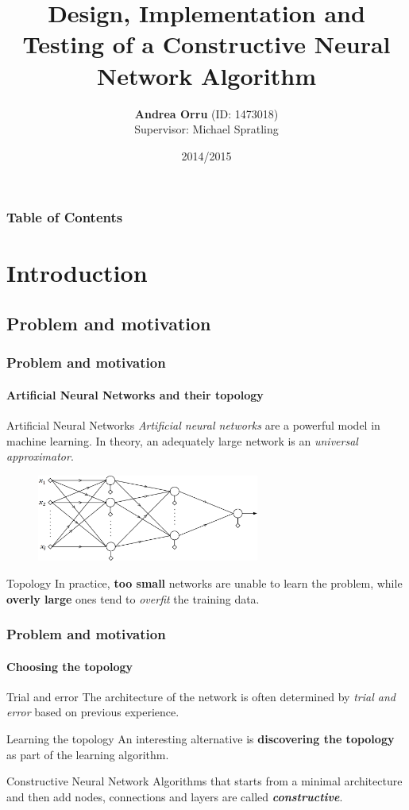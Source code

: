 \documentclass{beamer}
\title[Implementation of a Constructive Neural Network]{Design, Implementation and Testing of a Constructive Neural Network Algorithm}
\author[Andrea Orru]{\textbf{Andrea Orru} \small{(ID: 1473018)} \\ \small{Supervisor: Michael Spratling}}
\institute[King's College London]{Department of Informatics \\ King's College London}
\date{2014/2015}
\begin{document}
	\frame{\titlepage}
	
	\begin{frame}
		\frametitle{Table of Contents}
		\tableofcontents
	\end{frame}
	
	\section{Introduction}
		\subsection{Problem and motivation}
			\begin{frame}
				\frametitle{Problem and motivation}
				\framesubtitle{Artificial Neural Networks and their topology}
				\begin{block}{Artificial Neural Networks}
					\emph{Artificial neural networks} are a powerful model in machine learning. In theory, an adequately large network is an \emph{universal approximator}.
				\end{block}
				\begin{figure}[h]
					\centering
					\includegraphics[width=0.65\textwidth]{multilayer}
				\end{figure}
				\begin{alertblock}{Topology}
					In practice, \textbf{too small} networks are unable to learn the problem, while \textbf{overly large} ones tend to \emph{overfit} the training data.
				\end{alertblock}
			\end{frame}
			\begin{frame}
				\frametitle{Problem and motivation}
				\framesubtitle{Choosing the topology}
				\begin{block}{Trial and error}
					The architecture of the network is often determined by \emph{trial and error} based on previous experience.
				\end{block}
				\begin{block}{Learning the topology}
					An interesting alternative is \textbf{discovering the topology} as part of the learning algorithm.
				\end{block}
				\begin{exampleblock}{Constructive Neural Network}
					Algorithms that starts from a minimal architecture and then add nodes, connections and layers are called \textbf{\emph{constructive}}.
				\end{exampleblock}
			\end{frame}
\end{document}
